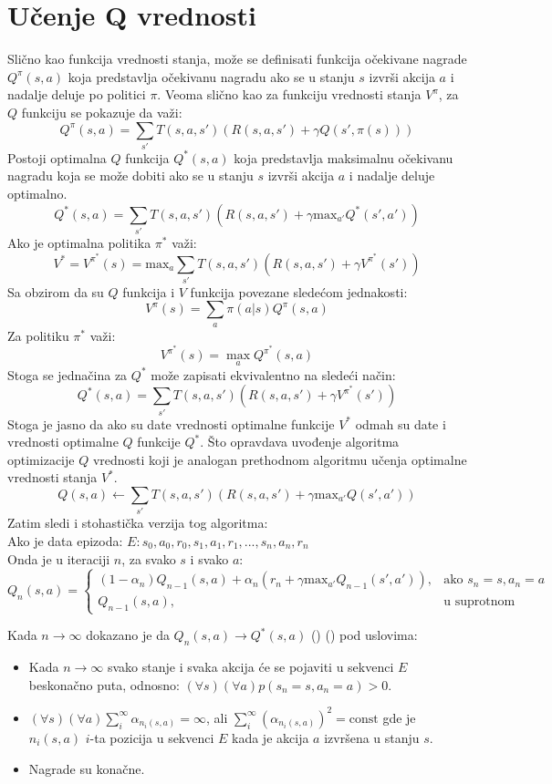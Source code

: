 \documentclass[a4paper,fleqn,12pt]{JMThesis}
\theoremstyle{plain}
\theoremstyle{definition}
\newcommand{\piopt}{{\pi}^{*}}
\theoremstyle{definition}
\begin{document}
\section{Učenje Q vrednosti}
Slično kao funkcija vrednosti stanja, može se definisati funkcija očekivane nagrade $Q^{\pi}(s,a)$ koja predstavlja očekivanu
nagradu ako se u stanju $s$ izvrši akcija $a$ i nadalje deluje po politici $\pi$. Veoma slično kao za funkciju vrednosti
stanja $V^{\pi}$, za $Q$ funkciju se pokazuje da važi:
\[
	Q^{\pi}(s,a) = \sum_{s'} T(s,a,s')(R(s,a,s') + \gamma Q(s',\pi(s)))
\]
Postoji optimalna $Q$ funkcija $Q^*(s,a)$ koja predstavlja maksimalnu očekivanu nagradu koja se može dobiti ako se u stanju
$s$ izvrši akcija $a$ i nadalje deluje optimalno.
\[
	Q^*(s,a) = \sum_{s'} T(s,a,s')(R(s,a,s') + \gamma \text{max}_{a'}Q^*(s',a'))
\]
Ako je optimalna politika $\piopt$ važi:
\[
	V^* = V^{\piopt}(s) = \text{max}_a \sum_{s'} T(s,a,s')(R(s,a,s') + \gamma V^{\piopt}(s'))
\]
Sa obzirom da su $Q$ funkcija i $V$ funkcija povezane sledećom jednakosti:
\[ V^{\pi}(s) = \sum_a \pi(a | s)Q^{\pi}(s,a) \]
Za politiku $\piopt$ važi:
\[ V^{\piopt}(s) = \max_a Q^{\piopt}(s,a) \]
Stoga se jednačina za $Q^*$ može zapisati ekvivalentno na sledeći način:
\[
	Q^*(s,a) = \sum_{s'} T(s,a,s')(R(s,a,s') + \gamma V^{\piopt}(s'))
\]
Stoga je jasno da ako su date vrednosti optimalne funkcije $V^*$ odmah su date i vrednosti optimalne $Q$ funkcije $Q^*$.
Što opravdava uvođenje algoritma optimizacije $Q$ vrednosti koji je analogan prethodnom algoritmu učenja optimalne vrednosti stanja $V^*$.
\[ Q(s,a) \leftarrow \sum_{s'}T(s,a,s')(R(s,a,s')+\gamma \text{max}_{a'}Q(s',a')) \]
Zatim sledi i stohastička verzija tog algoritma:\\
Ako je data epizoda: $E: s_0,a_0,r_0,s_1,a_1,r_1,...,s_n,a_n,r_n$\\
Onda je u iteraciji $n$, za svako $s$ i svako $a$:\\
\[ 
	Q_n(s,a) =
	\begin{cases}
		(1-\alpha_n)Q_{n-1}(s,a) + \alpha_n (r_n + \gamma \text{max}_{a'}Q_{n-1}(s',a')), & \text{ako } s_n = s, a_n = a\\
		Q_{n-1}(s,a), & \text{u suprotnom}
	\end{cases}
\]

Kada $n \to \infty$ dokazano je da $Q_n(s,a) \to Q^*(s,a)$ (\cite{watkins1992q}) (\cite{sutton2018reinforcement}) pod uslovima:
\begin{itemize}
	\item Kada $n \to \infty$ svako stanje i svaka akcija će se pojaviti u sekvenci $E$ beskonačno puta, odnosno: $(\forall s)(\forall a)p(s_n = s, a_n = a) > 0$.
 	\item $(\forall s)(\forall a)  \sum_i^{\infty}\alpha_{n_i(s,a)} = \infty$, ali $\sum_i^{\infty}\left(\alpha_{ {n_i(s,a)}}\right)^2 = \text{const}$ gde je $n_i(s,a)$ $i$-ta pozicija u sekvenci $E$ kada je akcija $a$ izvršena u stanju $s$.
  	\item Nagrade su konačne. 
\end{itemize}
\end{document}
